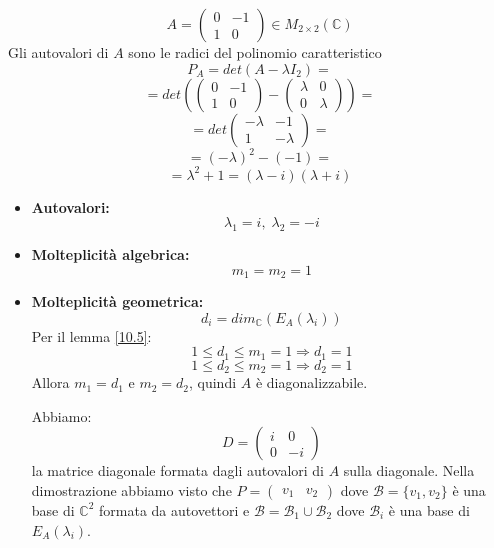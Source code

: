 \documentclass[a4paper]{article}
\theoremstyle{break}
\theoremstyle{break}
\theoremstyle{break}
\theoremstyle{break}
\begin{document}
\begin{example}
  \[
  A = \begin{pmatrix} 
    0 & -1\\
    1 & 0
  \end{pmatrix} 
  \in  M_{2 \times 2}(\mathbb{C})
  \] 
  Gli autovalori di \( A \) sono le radici del polinomio caratteristico
  \[
  P_A = det(A - \lambda I_2) =
  \] 
  \[
  = det \left( 
    \begin{pmatrix} 
      0 & -1\\
      1 & 0
    \end{pmatrix} 
    -
    \begin{pmatrix} 
      \lambda & 0\\
      0 & \lambda
    \end{pmatrix} 
  \right) =
  \] 
  \[
  = det \begin{pmatrix} 
    -\lambda & -1\\
    1 & -\lambda
  \end{pmatrix}
  =
  \] 
  \[
  = (-\lambda)^2 - (-1) =
  \] 
  \[
  = \lambda^2 + 1 = (\lambda-i)(\lambda+i)
  \] 
  \begin{itemize}
    \item \textbf{Autovalori:}
      \[
      \lambda_1 = i,\; \lambda_2 = -i
      \]
    \item \textbf{Molteplicità algebrica:}
      \[
      m_1 = m_2 = 1
      \]
    \item \textbf{Molteplicità geometrica:}
      \[
        d_i = dim_{\mathbb{C}}(E_A(\lambda_i))
      \] 
      Per il lemma \ref{10.5}:
      \[
      1 \le d_1 \le m_1 = 1 \Rightarrow d_1 = 1
      \] 
      \[
      1 \le d_2 \le m_2 = 1 \Rightarrow d_2 = 1
      \]
      Allora \( m_1 = d_1 \) e \( m_2 = d_2 \), quindi \( A \) è diagonalizzabile.

      \vspace{1em}
      \noindent Abbiamo:
      \[
      D = \begin{pmatrix} 
        i & 0\\
        0 & -i
      \end{pmatrix}
      \] 
      la matrice diagonale formata dagli autovalori di \( A \) sulla diagonale.
      Nella dimostrazione abbiamo visto che \( P = \begin{pmatrix} v_1 & v_2 \end{pmatrix}  \) 
      dove \( \mathcal{B} = \{v_1, v_2\}  \) è una base di \( \mathbb{C}^2 \) formata da
      autovettori e \( \mathcal{B} = \mathcal{B}_1 \cup \mathcal{B}_2 \) dove
      \( \mathcal{B}_i \) è una base di \( E_A(\lambda_i) \).


\end{itemize}
\end{example}
\end{document}

